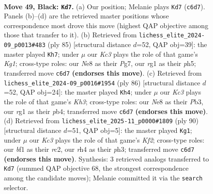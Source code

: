 \documentclass[11pt]{article}
\begin{document}
\clearpage

\begin{figure}[p]\centering
\begin{subfigure}{0.46\textwidth}\centering
\resizebox{\linewidth}{!}{%
\newchessgame
\chessboard[
  setfen={4n3/p1p5/2k5/5p2/r4P1R/8/r2B3P/2K2BR1 b - - 3 49},
  showmover=false,
  pgfstyle=straightmove, color=movearrow, markmove={c6-d7}
]}
\caption{}
\end{subfigure}\hfill
\begin{subfigure}{0.46\textwidth}\centering
\resizebox{\linewidth}{!}{%
\newchessgame
\chessboard[
  setfen={6k1/6p1/5p2/4p2P/1B5P/P7/r1r2PK1/5R2 b - - 0 43},
  showmover=false,
  pgfstyle=straightmove, color=movearrow, markmove={g8-h7}
]}
\caption{}
\end{subfigure}
\\[4pt]
\begin{subfigure}{0.46\textwidth}\centering
\resizebox{\linewidth}{!}{%
\newchessgame
\chessboard[
  setfen={r7/1b3k2/3p1n2/p5r1/1pPN4/1P5K/8/R3R3 w - - 2 44},
  showmover=false,
  pgfstyle=straightmove, color=movearrow, markmove={h3-h4}
]}
\caption{}
\end{subfigure}\hfill
\begin{subfigure}{0.46\textwidth}\centering
\resizebox{\linewidth}{!}{%
\newchessgame
\chessboard[
  setfen={5r2/R3Rpk1/P3b3/3pN3/3P4/6Pp/2r2K2/8 w - - 1 46},
  showmover=false,
  pgfstyle=straightmove, color=movearrow, markmove={f2-g1}
]}
\caption{}
\end{subfigure}
\caption{\textbf{Move 49, Black: \texttt{Kd7}.} (a) Our position; Melanie plays \texttt{Kd7} (\texttt{c6d7}). Panels (b)--(d) are the retrieved master positions whose correspondence most drove this move (highest QAP objective among those that transfer to it). (b) Retrieved from \texttt{lichess\_elite\_2024-09\_p0013\#483} (ply 85) [structural distance $d$=52, QAP obj=39]: the master played \texttt{Kh7}; under $\mu$ our \emph{Kc3} plays the role of that game's \emph{Kg1}; cross-type roles: our \emph{N}e8 as their \emph{P}g7, our \emph{r}g1 as their \emph{p}h5; transferred move \texttt{c6d7} \textbf{(endorses this move)}. (c) Retrieved from \texttt{lichess\_elite\_2024-09\_p0016\#1954} (ply 86) [structural distance $d$=52, QAP obj=24]: the master played \texttt{Kh4}; under $\mu$ our \emph{Kc3} plays the role of that game's \emph{Kh3}; cross-type roles: our \emph{N}e8 as their \emph{P}b3, our \emph{r}g1 as their \emph{p}b4; transferred move \texttt{c6d7} \textbf{(endorses this move)}. (d) Retrieved from \texttt{lichess\_elite\_2025-11\_p0000\#1809} (ply 90) [structural distance $d$=51, QAP obj=5]: the master played \texttt{Kg1}; under $\mu$ our \emph{Kc3} plays the role of that game's \emph{Kf2}; cross-type roles: our \emph{b}f1 as their \emph{r}c2, our \emph{r}h4 as their \emph{p}h3; transferred move \texttt{c6d7} \textbf{(endorses this move)}. Synthesis: 3 retrieved analogs transferred to \texttt{Kd7} (summed QAP objective 68, the strongest correspondence among the candidate moves); Melanie committed it via the \texttt{search} selector.}
\label{fig:thought-m97}
\end{figure}
\end{document}
